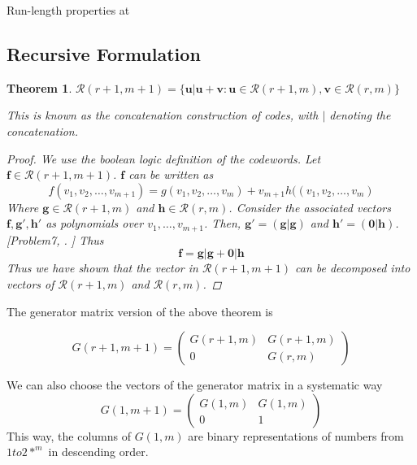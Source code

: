 \documentclass{article}
\newcommand{\RM}[2]{\ensuremath{\mathcal{R}(#1,#2)}}
\newcommand{\V}[1]{\ensuremath{\mathbf{#1}}}
\theoremstyle{plain}
\newtheorem{thm}{Theorem}
\begin{document}
Run-length properties at \cite{syncro}


\subsection{Recursive Formulation}

\begin{thm}
$\RM{r+1}{m+1} =  \{ \V{u} | \V{u}+\V{v} : \V{u} \in \RM{r+1}{m}, \V{v} \in \RM{r}{m} \}$


This is known as the concatenation construction of codes, with $|$ denoting the concatenation.

\begin{proof} We use the boolean logic definition of the codewords.
Let $\V{f} \in \RM{r+1}{m+1}$.  $\V{f}$ can be written as \begin{equation*}
f(v_1,v_2,\ldots,v_{m+1}) = g(v_1,v_2,\ldots,v_m)+v_{m+1}h((v_1,v_2,\ldots,v_{m})
\end{equation*}
Where $\V{g} \in \RM{r+1}{m} $ and $\V{h} \in \RM{r}{m}$. Consider the associated vectors $\V{f}, \V{g'}, \V{h'}$ as polynomials over $v_1,\ldots,v_{m+1}$. 
Then, $\V{g'} = (\V{g}|\V{g})$ and $\V{h'} = (\V{0}|\V{h})$. [Problem7, \cite{sloane}. ]
Thus
\begin{equation*}
  \V{f} = \V{g}|\V{g} + \V{0}|\V{h}
\end{equation*}
Thus we have shown that the vector in $\RM{r+1}{m+1}$ can be decomposed into vectors of $\RM{r+1}{m}$ and $\RM{r}{m}$.
\end{proof}

\end{thm}
The generator matrix version of the above theorem is

\begin{equation}
G(r+1,m+1) = \begin{pmatrix}
G(r+1,m) & G(r+1,m) \\
0 & G(r,m) 
\end{pmatrix}
\end{equation}

We can also choose the vectors of the generator matrix in a systematic way \begin{equation}
G(1,m+1) = \begin{pmatrix}
G(1,m) & G(1,m) \\
0 & 1
\end{pmatrix}
\end{equation}
This way, the columns of $G(1,m)$ are binary representations of numbers from $1 to 2*^m$ in descending order.
\end{document}

